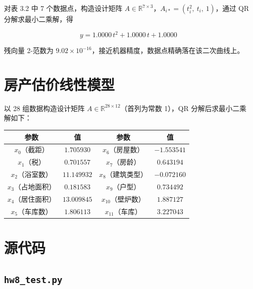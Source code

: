\documentclass[10pt, a4paper]{article}
\begin{document}
对表 3.2 中 7 个数据点，构造设计矩阵 $A\in\mathbb{R}^{7\times3}$，$A_{i*}=(t_i^2,\ t_i,\ 1)$，通过 QR 分解求最小二乘解，得

\[
    \boxed{y = 1.0000\,t^2 + 1.0000\,t + 1.0000}
\]

残向量 2-范数为 $9.02\times10^{-16}$，接近机器精度，数据点精确落在该二次曲线上。

\section{房产估价线性模型}

以 28 组数据构造设计矩阵 $A\in\mathbb{R}^{28\times12}$（首列为常数 1），QR 分解后求最小二乘解如下：

\begin{table}[H]
    \centering
    \begin{tabular}{cc|cc}
        \toprule
        参数 & 值 & 参数 & 值 \\
        \midrule
        $x_0$（截距）    & $1.705930$  & $x_6$（房屋数）  & $-1.553541$ \\
        $x_1$（税）      & $0.701557$  & $x_7$（房龄）    & $0.643194$  \\
        $x_2$（浴室数）  & $11.149932$ & $x_8$（建筑类型）& $-0.072160$ \\
        $x_3$（占地面积）& $0.181583$  & $x_9$（户型）    & $0.734492$  \\
        $x_4$（居住面积）& $13.009845$ & $x_{10}$（壁炉数）& $1.887127$ \\
        $x_5$（车库数）  & $1.806113$  & $x_{11}$（车库）  & $3.227043$ \\
        \bottomrule
    \end{tabular}
\end{table}

\appendix
\section{源代码}

\subsection{\texttt{hw8\_test.py}}

\end{document}

